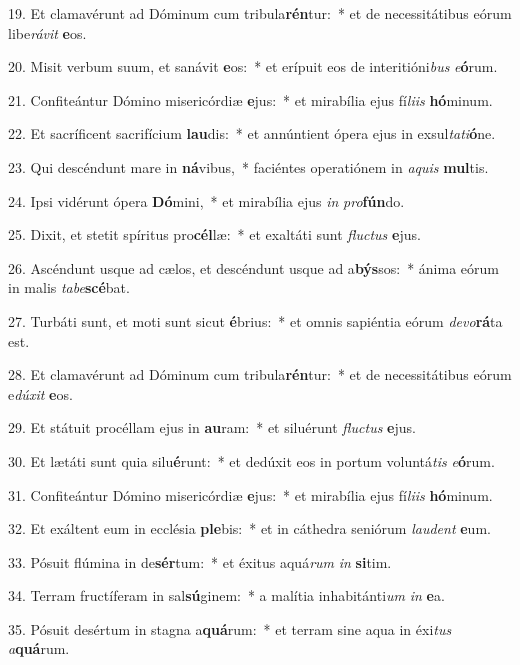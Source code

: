 19. Et clamavérunt ad Dóminum cum tribula\textbf{rén}tur:~*  et de necessitátibus eórum libe\textit{rá}\textit{vit} \textbf{e}os.\

20. Misit verbum suum, et sanávit \textbf{e}os:~*  et erípuit eos de interitióni\textit{bus} \textit{e}\textbf{ó}rum.\

21. Confiteántur Dómino misericórdiæ \textbf{e}jus:~*  et mirabília ejus fí\textit{li}\textit{is} \textbf{hó}minum.\

22. Et sacríficent sacrifícium \textbf{lau}dis:~*  et annúntient ópera ejus in exsul\textit{ta}\textit{ti}\textbf{ó}ne.\

23. Qui descéndunt mare in \textbf{ná}vibus,~*  faciéntes operatiónem in \textit{a}\textit{quis} \textbf{mul}tis.\

24. Ipsi vidérunt ópera \textbf{Dó}mini,~*  et mirabília ejus \textit{in} \textit{pro}\textbf{fún}do.\

25. Dixit, et stetit spíritus pro\textbf{cél}læ:~*  et exaltáti sunt \textit{fluc}\textit{tus} \textbf{e}jus.\

26. Ascéndunt usque ad cælos, et descéndunt usque ad a\textbf{býs}sos:~*  ánima eórum in malis \textit{ta}\textit{be}\textbf{scé}bat.\

27. Turbáti sunt, et moti sunt sicut \textbf{é}brius:~*  et omnis sapiéntia eórum \textit{de}\textit{vo}\textbf{rá}ta est.\

28. Et clamavérunt ad Dóminum cum tribula\textbf{rén}tur:~*  et de necessitátibus eórum e\textit{dú}\textit{xit} \textbf{e}os.\

29. Et státuit procéllam ejus in \textbf{au}ram:~*  et siluérunt \textit{fluc}\textit{tus} \textbf{e}jus.\

30. Et lætáti sunt quia silu\textbf{é}runt:~*  et dedúxit eos in portum voluntá\textit{tis} \textit{e}\textbf{ó}rum.\

31. Confiteántur Dómino misericórdiæ \textbf{e}jus:~*  et mirabília ejus fí\textit{li}\textit{is} \textbf{hó}minum.\

32. Et exáltent eum in ecclésia \textbf{ple}bis:~*  et in cáthedra seniórum \textit{lau}\textit{dent} \textbf{e}um.\

33. Pósuit flúmina in de\textbf{sér}tum:~*  et éxitus aquá\textit{rum} \textit{in} \textbf{si}tim.\

34. Terram fructíferam in sal\textbf{sú}ginem:~*  a malítia inhabitánti\textit{um} \textit{in} \textbf{e}a.\

35. Pósuit desértum in stagna a\textbf{quá}rum:~*  et terram sine aqua in éxi\textit{tus} \textit{a}\textbf{quá}rum.\

